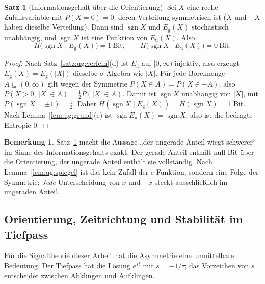 \documentclass[a4paper,12pt,twoside]{report}
\theoremstyle{definition}
\newtheorem{satz}{Satz}
\newtheorem{bemerkung}{Bemerkung}
\begin{document}
\begin{satz}[Informationsgehalt über die Orientierung]\label{satz:ug:info}
Sei $X$ eine reelle Zufallsvariable mit $P(X=0)=0$, deren Verteilung symmetrisch ist ($X$ und $-X$ haben dieselbe Verteilung). Dann sind $\operatorname{sgn}X$ und $E_{\mathrm g}(X)$ stochastisch unabhängig, und $\operatorname{sgn}X$ ist eine Funktion von $E_{\mathrm u}(X)$. Also
\[
H\big(\operatorname{sgn}X\mid E_{\mathrm g}(X)\big)=1\ \text{Bit},\qquad H\big(\operatorname{sgn}X\mid E_{\mathrm u}(X)\big)=0\ \text{Bit}.
\]
\end{satz}

\begin{proof}
Nach Satz~\ref{satz:ug:verfein}(d) ist $E_{\mathrm g}$ auf $[0,\infty)$ injektiv, also erzeugt $E_{\mathrm g}(X)=E_{\mathrm g}(|X|)$ dieselbe $\sigma$-Algebra wie $|X|$. Für jede Borelmenge $A\subseteq(0,\infty)$ gilt wegen der Symmetrie $P(X\in A)=P(X\in-A)$, also $P(X>0,\,|X|\in A)=\tfrac12P(|X|\in A)$. Damit ist $\operatorname{sgn}X$ unabhängig von $|X|$, mit $P(\operatorname{sgn}X=\pm1)=\tfrac12$. Daher $H(\operatorname{sgn}X\mid E_{\mathrm g}(X))=H(\operatorname{sgn}X)=1$ Bit. Nach Lemma~\ref{lem:ug:grund}(e) ist $\operatorname{sgn}E_{\mathrm u}(X)=\operatorname{sgn}X$, also ist die bedingte Entropie $0$.
\end{proof}

\begin{bemerkung}
Satz~\ref{satz:ug:info} macht die Aussage „der ungerade Anteil wiegt schwerer“ im Sinne des Informationsgehalts exakt: Der gerade Anteil enthält null Bit über die Orientierung, der ungerade Anteil enthält sie vollständig. Nach Lemma~\ref{lem:ug:spiegel} ist das kein Zufall der e-Funktion, sondern eine Folge der Symmetrie: \emph{Jede} Unterscheidung von $x$ und $-x$ steckt ausschließlich im ungeraden Anteil.
\end{bemerkung}

\subsection{Orientierung, Zeitrichtung und Stabilität im Tiefpass}
\label{sec:ug:zeit}

Für die Signaltheorie dieser Arbeit hat die Asymmetrie eine unmittelbare Bedeutung. Der Tiefpass hat die Lösung $e^{st}$ mit $s=-1/\tau$; das Vorzeichen von $s$ entscheidet zwischen Abklingen und Aufklingen.
\end{document}
